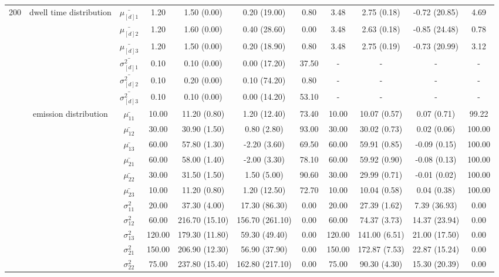 \begin{table}[h]
{\begin{tabular}{ccccccccccc}
200 & dwell time distribution & $\bar{\mu_{[d]1}}$ & 1.20 & 1.50 (0.00) & 0.20 (19.00) & 0.80 & 3.48 & 2.75 (0.18) & -0.72 (20.85) & 4.69 \\
\multirow{26}{*}{} & \multirow{5}{*}{} & $\bar{\mu_{[d]2}}$ & 1.20 & 1.60 (0.00) & 0.40 (28.60) & 0.00 & 3.48 & 2.63 (0.18) & -0.85 (24.48) & 0.78 \\
 &  & $\bar{\mu_{[d]3}}$ & 1.20 & 1.50 (0.00) & 0.20 (18.90) & 0.80 & 3.48 & 2.75 (0.19) & -0.73 (20.99) & 3.12 \\
 &  & $\bar{\sigma^2_{[d]1}}$ & 0.10 & 0.10 (0.00) & 0.00 (17.20) & 37.50 & - & - & - & - \\
 &  & $\bar{\sigma^2_{[d]2}}$ & 0.10 & 0.20 (0.00) & 0.10 (74.20) & 0.80 & - & - & - & - \\
 &  & $\bar{\sigma^2_{[d]3}}$ & 0.10 & 0.10 (0.00) & 0.00 (14.20) & 53.10 & - & - & - & - \\
 & emission distribution & $\bar{\mu_{11}}$ & 10.00 & 11.20 (0.80) & 1.20 (12.40) & 73.40 & 10.00 & 10.07 (0.57) & 0.07 (0.71) & 99.22 \\
 & \multirow{11}{*}{} & $\bar{\mu_{12}}$ & 30.00 & 30.90 (1.50) & 0.80 (2.80) & 93.00 & 30.00 & 30.02 (0.73) & 0.02 (0.06) & 100.00 \\
 &  & $\bar{\mu_{13}}$ & 60.00 & 57.80 (1.30) & -2.20 (3.60) & 69.50 & 60.00 & 59.91 (0.85) & -0.09 (0.15) & 100.00 \\
 &  & $\bar{\mu_{21}}$ & 60.00 & 58.00 (1.40) & -2.00 (3.30) & 78.10 & 60.00 & 59.92 (0.90) & -0.08 (0.13) & 100.00 \\
 &  & $\bar{\mu_{22}}$ & 30.00 & 31.50 (1.50) & 1.50 (5.00) & 90.60 & 30.00 & 29.99 (0.71) & -0.01 (0.02) & 100.00 \\
 &  & $\bar{\mu_{23}}$ & 10.00 & 11.20 (0.80) & 1.20 (12.50) & 72.70 & 10.00 & 10.04 (0.58) & 0.04 (0.38) & 100.00 \\
 &  & $\sigma^2_{11}$ & 20.00 & 37.30 (4.00) & 17.30 (86.30) & 0.00 & 20.00 & 27.39 (1.62) & 7.39 (36.93) & 0.00 \\
 &  & $\sigma^2_{12}$ & 60.00 & 216.70 (15.10) & 156.70 (261.10) & 0.00 & 60.00 & 74.37 (3.73) & 14.37 (23.94) & 0.00 \\
 &  & $\sigma^2_{13}$ & 120.00 & 179.30 (11.80) & 59.30 (49.40) & 0.00 & 120.00 & 141.00 (6.51) & 21.00 (17.50) & 0.00 \\
 &  & $\sigma^2_{21}$ & 150.00 & 206.90 (12.30) & 56.90 (37.90) & 0.00 & 150.00 & 172.87 (7.53) & 22.87 (15.24) & 0.00 \\
 &  & $\sigma^2_{22}$ & 75.00 & 237.80 (15.40) & 162.80 (217.10) & 0.00 & 75.00 & 90.30 (4.30) & 15.30 (20.39) & 0.00 \\

\end{tabular}}
\end{table}
